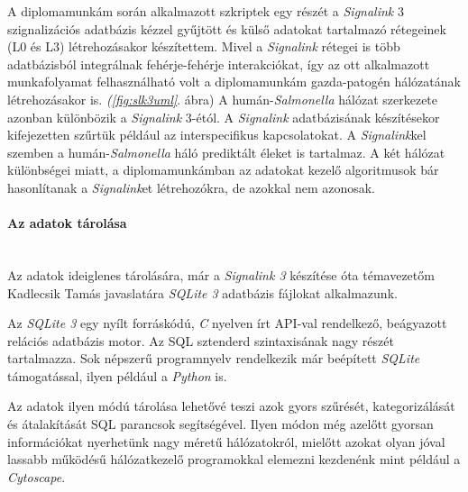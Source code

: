 \documentclass[a4paper,12pt]{article}
\begin{document}
			A diplomamunkám során alkalmazott szkriptek egy részét a \textit{Signalink} 3 szignalizációs adatbázis kézzel gyűjtött és külső adatokat tartalmazó rétegeinek (L0 és L3) létrehozásakor készítettem.  Mivel a \textit{Signalink} rétegei is több adatbázisból integrálnak fehérje-fehérje interakciókat, így az ott alkalmazott munkafolyamat felhasználható volt a diplomamunkám gazda-patogén hálózatának létrehozásakor is. \textit{(\ref{fig:slk3uml}}. ábra) A humán-\textit{Salmonella} hálózat szerkezete azonban különbözik a \textit{Signalink} 3-étól. A \textit{Signalink} adatbázisának készítésekor kifejezetten szűrtük például az interspecifikus kapcsolatokat. A \textit{Signalink}kel szemben a humán-\textit{Salmonella} háló prediktált éleket is tartalmaz. A két hálózat különbségei miatt, a diplomamunkámban az adatokat kezelő algoritmusok bár hasonlítanak a \textit{Signalink}et létrehozókra, de azokkal nem azonosak.
			
			\paragraph{Az adatok tárolása} \mbox{}\\
			Az adatok ideiglenes tárolására, már a \textit{Signalink 3} készítése óta témavezetőm Kadlecsik Tamás javaslatára \textit{SQLite 3} adatbázis fájlokat alkalmazunk. 
			
			
			Az \textit{SQLite 3} egy nyílt forráskódú, \textit{C} nyelven írt API-val rendelkező, beágyazott relációs adatbázis motor. Az SQL sztenderd szintaxisának nagy részét tartalmazza. Sok népszerű programnyelv rendelkezik már beépített \textit{SQLite} támogatással, ilyen például a \textit{Python} is. \cite{sqlite3}			
			
				
			Az adatok ilyen módú tárolása lehetővé teszi azok gyors szűrését, kategorizálását és átalakítását SQL parancsok segítségével. Ilyen módon még azelőtt gyorsan információkat nyerhetünk nagy méretű hálózatokról, mielőtt azokat olyan jóval lassabb működésű hálózatkezelő programokkal elemezni kezdenénk mint például a \textit{Cytoscape}.
\end{document}
